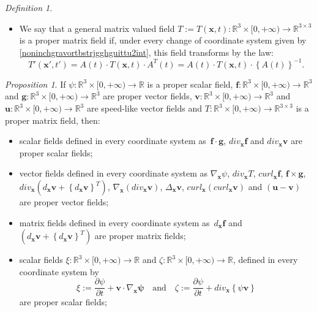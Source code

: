 \documentclass{article}
\newtheorem{proposition}{Proposition}[section]
\theoremstyle{definition}
\newtheorem{definition}{Definition}[section]
\theoremstyle{remark}
\renewcommand{\vec}[1]{\mathbf{#1}}
\newcommand{\R}{\mathbb{R}}
\newcommand{\er}{\eqref}
\newcommand{\R}{{\mathbb{R}}}
\newcommand{\er}{\eqref}
\newtheorem{proposition}{Proposition}
\newtheorem{definition}{Definition}
\begin{document}
\begin{definition}
\begin{itemize}
\item
We say that a general matrix valued field $T:=T(\vec
x,t):\R^3\times[0,+\infty)\to\R^{3\times 3}$ is a proper matrix
field if, under every change of coordinate system given by
\er{noninchgravortbstrjgghguittu2int}, this field transforms by the
law:
\begin{equation}\label{uguyytfddddgghjjghjjjint}
T'(\vec x',t')=A(t)\cdot T(\vec x,t)\cdot A^T(t)=A(t)\cdot T(\vec
x,t)\cdot \left\{A(t)\right\}^{-1}.
\end{equation}
\end{itemize}
\end{definition}
\begin{proposition}\label{yghgjtgyrtrtint}
If $\psi:\R^3\times[0,+\infty)\to\R$ is a proper scalar field, $\vec
f:\R^3\times[0,+\infty)\to\R^3$ and $\vec
g:\R^3\times[0,+\infty)\to\R^3$ are proper vector fields, $\vec
v:\R^3\times[0,+\infty)\to\R^3$ and $\vec
u:\R^3\times[0,+\infty)\to\R^3$ are speed-like vector fields and
$T:\R^3\times[0,+\infty)\to\R^{3\times 3}$ is a proper matrix field,
then:
\begin{itemize}
\item[{\bf(i)}] scalar fields defined in every coordinate system as $\,\vec f\cdot\vec g$, $div_{\vec x} \vec f$ and $div_{\vec x} \vec
v$ are proper scalar fields;

\item[{\bf(ii)}] vector fields defined in every coordinate system as $\nabla_{\vec x}\psi$, $div_{\vec x} T$, $curl_{\vec x}\vec
f$, $\vec f\times\vec g$,
$div_{\vec x}\left(d_{\vec x} \vec v+\left\{d_{\vec x} \vec
v\right\}^T\right)$, $\nabla_{\vec x}\left(div_{\vec x}\vec
v\right)$, $\Delta_{\vec x}\vec v$, $curl_{\vec x}\left(curl_{\vec
x}\vec v\right)$ and $(\vec u-\vec v)$ are proper vector fields;

\item[{\bf(iii)}] matrix fields defined in every coordinate system as $\,d_{\vec x} \vec f$ and $\left(d_{\vec x} \vec v+\left\{d_{\vec x} \vec v\right\}^T\right)$ are proper
matrix fields;

\item[{\bf(iv)}] scalar fields $\xi:\R^3\times[0,+\infty)\to\R$ and $\zeta:\R^3\times[0,+\infty)\to\R$, defined
in every coordinate system by
\begin{equation}\label{vfyutuyfffhhgfhgfhgtgint}
\xi:=\frac{\partial\psi}{\partial t}+\vec v\cdot\nabla_{\vec x}\vec
\psi\quad \text{and}\quad \zeta:=\frac{\partial\psi}{\partial
t}+div_{\vec x}\left\{ \psi\vec v\right\}
\end{equation}
are proper scalar fields;


\end{itemize}
\end{proposition}
\end{document}
